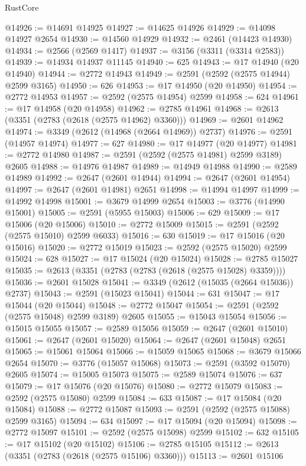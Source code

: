 \begin{lexlean}{RustCore}
\begin{coremodule}
@14926 := @14691 @14925
@14927 := @14625 @14926
@14929 := @14098 @14927 @2654
@14930 := @14560 @14929
@14932 := @2461 (@14423 @14930)
@14934 := @2566 (@2569 @1417)
@14937 := @3156 (@3311 (@3314 @2583))
@14939 := @14934 @14937 @11145
@14940 := 625
@14943 := @17 @14940 (@20 @14940)
@14944 := @2772 @14943
@14949 := @2591 (@2592 (@2575 @14944) @2599 @3165)
@14950 := 626
@14953 := @17 @14950 (@20 @14950)
@14954 := @2772 @14953
@14957 := @2592 (@2575 @14954) @2599
@14958 := 624
@14961 := @17 @14958 (@20 @14958)
@14962 := @2785 @14961
@14968 := @2613 (@3351 (@2783 (@2618 (@2575 @14962) @3360)))
@14969 := @2601 @14962
@14974 := @3349 (@2612 (@14968 (@2664 @14969)) @2737)
@14976 := @2591 (@14957 @14974)
@14977 := 627
@14980 := @17 @14977 (@20 @14977)
@14981 := @2772 @14980
@14987 := @2591 (@2592 (@2575 @14981) @2599 @3189) @2605
@14988 := @14976 @14987
@14989 := @14949 @14988
@14990 := @2589 @14989
@14992 := @2647 (@2601 @14944)
@14994 := @2647 (@2601 @14954)
@14997 := @2647 (@2601 @14981) @2651
@14998 := @14994 @14997
@14999 := @14992 @14998
@15001 := @3679 @14999 @2654
@15003 := @3776 (@14990 @15001)
@15005 := @2591 (@5955 @15003)
@15006 := 629
@15009 := @17 @15006 (@20 @15006)
@15010 := @2772 @15009
@15015 := @2591 (@2592 (@2575 @15010) @2599 @6033)
@15016 := 630
@15019 := @17 @15016 (@20 @15016)
@15020 := @2772 @15019
@15023 := @2592 (@2575 @15020) @2599
@15024 := 628
@15027 := @17 @15024 (@20 @15024)
@15028 := @2785 @15027
@15035 := @2613 (@3351 (@2783 (@2783 (@2618 (@2575 @15028) @3359))))
@15036 := @2601 @15028
@15041 := @3349 (@2612 (@15035 (@2664 @15036)) @2737)
@15043 := @2591 (@15023 @15041)
@15044 := 631
@15047 := @17 @15044 (@20 @15044)
@15048 := @2772 @15047
@15054 := @2591 (@2592 (@2575 @15048) @2599 @3189) @2605
@15055 := @15043 @15054
@15056 := @15015 @15055
@15057 := @2589 @15056
@15059 := @2647 (@2601 @15010)
@15061 := @2647 (@2601 @15020)
@15064 := @2647 (@2601 @15048) @2651
@15065 := @15061 @15064
@15066 := @15059 @15065
@15068 := @3679 @15066 @2654
@15070 := @3776 (@15057 @15068)
@15073 := @2591 (@3592 @15070) @2605
@15074 := @15005 @15073
@15075 := @2589 @15074
@15076 := 637
@15079 := @17 @15076 (@20 @15076)
@15080 := @2772 @15079
@15083 := @2592 (@2575 @15080) @2599
@15084 := 633
@15087 := @17 @15084 (@20 @15084)
@15088 := @2772 @15087
@15093 := @2591 (@2592 (@2575 @15088) @2599 @3165)
@15094 := 634
@15097 := @17 @15094 (@20 @15094)
@15098 := @2772 @15097
@15101 := @2592 (@2575 @15098) @2599
@15102 := 632
@15105 := @17 @15102 (@20 @15102)
@15106 := @2785 @15105
@15112 := @2613 (@3351 (@2783 (@2618 (@2575 @15106) @3360)))
@15113 := @2601 @15106

\end{coremodule}
\end{lexlean}
